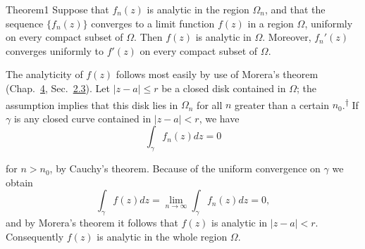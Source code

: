 \begin{originalstatement}{Theorem}{1}\label{thm:5.1}
Suppose that $f_{n}(z)$ is analytic in the region $\Omega_{n}$, and that the sequence $\{f_{n}(z)\}$ converges to a limit function $f(z)$ in a region $\Omega$, uniformly on every compact subset of $\Omega$. Then $f(z)$ is analytic in $\Omega$. Moreover, $f_{n}'(z)$ converges uniformly to $f'(z)$ on every compact subset of $\Omega$.
\end{originalstatement}
The analyticity of $f(z)$ follows most easily by use of Morera's theorem (Chap.~\hyperref[chap:4]{4}, Sec.~\hyperref[sec:4.2.3]{2.3}). Let $|z - a| \leq r$ be a closed disk contained in $\Omega$; the assumption implies that this disk lies in $\Omega_n$ for all $n$ greater than a certain $n_0$.\hyperlink{fn:192:dagger}{\textsuperscript{\ensuremath{\dagger}}} If $\gamma$ is any closed curve contained in $|z - a| < r$, we have
\begin{equation*}
\int_ {\gamma} f _ {n} (z) d z = 0
\end{equation*}
\begingroup\renewcommand{\thefootnote}{}\endgroup

for $n > n_0$, by Cauchy's theorem. Because of the uniform convergence on $\gamma$ we obtain
\begin{equation*}
\int_ {\gamma} f (z) d z = \lim _ {n \rightarrow \infty} \int_ {\gamma} f _ {n} (z) d z = 0,
\end{equation*}
and by Morera's theorem it follows that $f(z)$ is analytic in $|z - a| < r$. Consequently $f(z)$ is analytic in the whole region $\Omega$.


